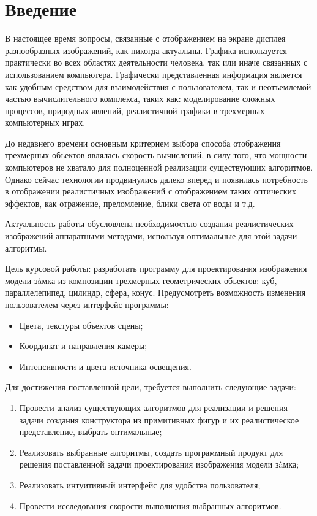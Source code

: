 \chapter*{Введение}

В настоящее время вопросы, связанные с отображением на экране дисплея разнообразных изображений, как никогда актуальны. Графика используется практически во всех областях деятельности человека, так или иначе связанных с использованием компьютера. Графически представленная информация является как удобным средством для взаимодействия с пользователем, так и неотъемлемой частью вычислительного комплекса, таких как: моделирование сложных процессов, природных явлений, реалистичной графики в трехмерных компьютерных играх.

До недавнего времени основным критерием выбора способа отображения трехмерных объектов являлась скорость вычислений, в силу того, что мощности компьютеров не хватало для полноценной реализации существующих алгоритмов. Однако сейчас технологии продвинулись далеко вперед и появилась потребность в отображении реалистичных изображений с отображением таких оптических эффектов, как отражение, преломление, блики света от воды и т.д.

Актуальность работы обусловлена необходимостью создания реалистических изображений аппаратными методами, используя оптимальные для этой задачи алгоритмы.


Цель курсовой работы: разработать программу для проектирования изображения модели зàмка из композиции трехмерных геометрических объектов: куб, параллелепипед, цилиндр, сфера, конус. Предусмотреть возможность изменения пользователем через интерфейс программы:
\begin{itemize}
	\item Цвета, текстуры объектов сцены;
	\item Координат и направления камеры;
	\item Интенсивности и цвета источника освещения.
\end{itemize}
\newpage
Для достижения поставленной цели, требуется выполнить следующие задачи:
\begin{enumerate}
	\item Провести анализ существующих алгоритмов для реализации и решения задачи создания конструктора из примитивных фигур и их реалистическое представление, выбрать оптимальные;
	\item Реализовать выбранные алгоритмы, создать программный продукт для решения поставленной задачи проектирования изображения модели зàмка;
	\item Реализовать интуитивный интерфейс для удобства пользователя;
	\item Провести исследования скорости выполнения выбранных алгоритмов.
\end{enumerate}
